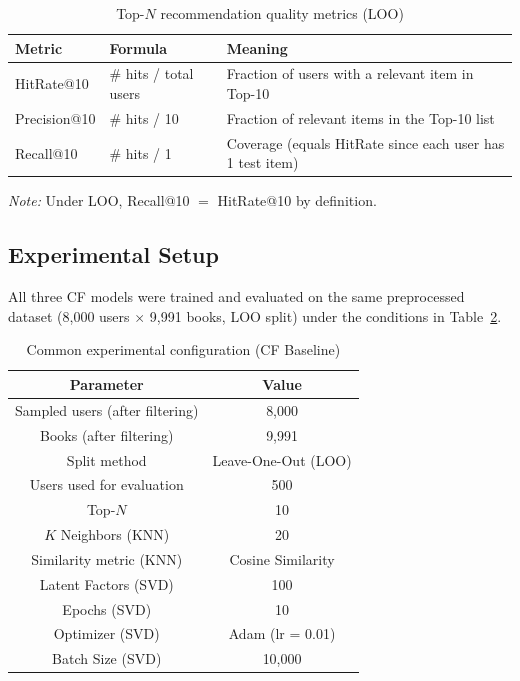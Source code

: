 \documentclass[12pt, a4paper]{article}
\begin{document}
\begin{table}[H]
  \centering
  \caption{Top-$N$ recommendation quality metrics (LOO)}
  \label{tab:metrics_topn}
  \begin{tabular}{|l|l|p{6cm}|}
    \hline
    \textbf{Metric}    & \textbf{Formula}           & \textbf{Meaning} \\
    \hline
    HitRate@10         & \# hits / total users       & Fraction of users with a relevant item in Top-10 \\
    \hline
    Precision@10       & \# hits / 10                & Fraction of relevant items in the Top-10 list \\
    \hline
    Recall@10          & \# hits / 1                 & Coverage (equals HitRate since each user has 1 test item) \\
    \hline
  \end{tabular}
\end{table}

\textit{Note:} Under LOO, Recall@10 $=$ HitRate@10 by definition.

\subsection{Experimental Setup}

All three CF models were trained and evaluated on the same preprocessed dataset
(8,000 users $\times$ 9,991 books, LOO split) under the conditions in Table~\ref{tab:config}.

\begin{table}[H]
  \centering
  \caption{Common experimental configuration (CF Baseline)}
  \label{tab:config}
  \begin{tabular}{|c|c|}
    \hline
    \textbf{Parameter}               & \textbf{Value} \\
    \hline
    Sampled users (after filtering)  & 8,000 \\
    \hline
    Books (after filtering)          & 9,991 \\
    \hline
    Split method                     & Leave-One-Out (LOO) \\
    \hline
    Users used for evaluation        & 500 \\
    \hline
    Top-$N$                          & 10 \\
    \hline
    $K$ Neighbors (KNN)              & 20 \\
    \hline
    Similarity metric (KNN)          & Cosine Similarity \\
    \hline
    Latent Factors (SVD)             & 100 \\
    \hline
    Epochs (SVD)                     & 10 \\
    \hline
    Optimizer (SVD)                  & Adam (lr = 0.01) \\
    \hline
    Batch Size (SVD)                 & 10,000 \\
    \hline
  \end{tabular}
\end{table}
\end{document}
